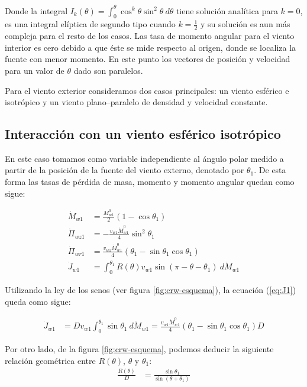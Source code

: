 Donde la integral $I_k(\theta) = \int^\theta_0 \cos^k\theta \sin^2\theta~d\theta$ tiene solución analítica para $k=0$,
es una integral elíptica de segundo tipo cuando $k=\frac{1}{2}$ y su solución es aun más compleja para el resto de los
casos. Las tasa de momento angular para el viento interior es cero debido a que éste se mide respecto al origen, donde
se localiza la fuente con menor momento. En este punto los vectores de posición y velocidad para un valor de $\theta$
dado son paralelos.

Para el viento exterior consideramos dos casos principales: un viento esférico e isotrópico y un viento
plano--paralelo de densidad y velocidad constante.

\subsection{Interacción con un viento esférico isotrópico}
\label{sec:mod-isotropic}
En este caso tomamos como variable independiente al ángulo polar medido a partir de la posición de la fuente del viento
externo, denotado por $\theta_1$. De esta forma las tasas de pérdida de masa, momento y momento angular quedan como sigue:

\begin{align}
  \dot{M}_{w1} &= \frac{M^0_{w1}}{2}\left(1 - \cos\theta_1\right)\\
  \dot{\Pi}_{wz1} &= -\frac{v_{w1}\dot{M}^0_{w1}}{4}\sin^2\theta_1\\
  \dot{\Pi}_{wr1} &= \frac{v_{w1}\dot{M}^0_{w1}}{4}\left(\theta_1 - \sin\theta_1\cos\theta_1\right)\\
  \dot{J}_{w1} &= \int^{\theta_1}_0 R(\theta)v_{w1}\sin(\pi-\theta-\theta_1)~d\dot{M}_{w1} \label{eq:J1}
\end{align}

Utilizando la ley de los senos (ver figura \ref{fig:crw-esquema}), la ecuación (\ref{eq:J1}) queda como sigue:

\begin{align}
  \dot{J}_{w1} &= Dv_{w1}\int^{\theta_1}_0 \sin\theta_1~d\dot{M}_{w1} =
                 \frac{v_{w1}\dot{M}^0_{w1}}{4}\left(\theta_1 - \sin\theta_1\cos\theta_1\right) D \label{eq:J1-iso}
\end{align}

Por otro lado, de la figura \ref{fig:crw-esquema}, podemos deducir la siguiente relación geométrica entre $R(\theta)$,
$\theta$ y $\theta_1$:
\begin{align}
  \frac{R(\theta)}{D} &= \frac{\sin\theta_1}{\sin(\theta+\theta_1)} \label{eq:R-geometric}
\end{align}

